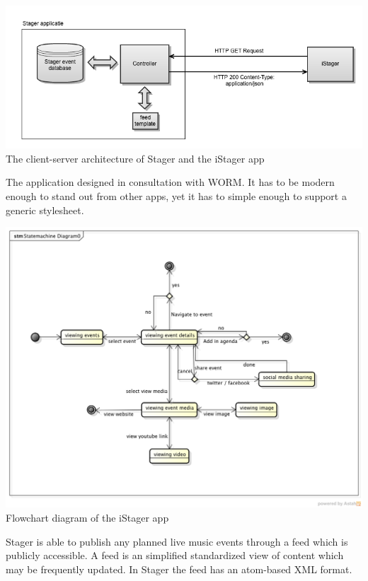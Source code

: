 \begin{centering}
	\includegraphics[scale=0.4]{images/globale_architectuur.png}\\{The client-server architecture of Stager and the iStager app}\\
\end{centering}

The application designed in consultation with WORM. It has to be modern enough to stand out from other apps, yet it has to simple enough to support a generic stylesheet.


\begin{centering}
	\includegraphics[scale=0.4]{images/stagerapp_statediagram.png}\\{Flowchart diagram of the iStager app}\\
\end{centering}


Stager is able to publish any planned live music events through a feed which is publicly accessible. A feed is an simplified standardized view of content which may be frequently updated. In Stager the feed has an atom-based XML format.

